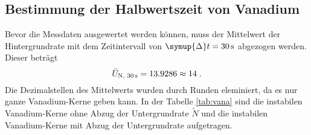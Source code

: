\subsection{Bestimmung der Halbwertszeit von Vanadium}
\label{sub:Vana}
Bevor die Messdaten ausgewertet werden können, muss der Mittelwert der Hintergrundrate mit dem Zeitintervall von $\symup{\Delta} t = \SI{30}{\second}$
abgezogen werden. Dieser beträgt
\begin{equation*}
    \bar{U}_\text{N, \SI{30}{\second}} = 13.9286 \approx 14 \; \text{.}
\end{equation*}
Die Dezimalstellen des Mittelwerts wurden durch Runden eleminiert, da es nur ganze Vanadium-Kerne geben kann.
In der Tabelle \ref{tab:vana} sind die instabilen Vanadium-Kerne ohne Abzug der Untergrundrate $\tilde{N}$ und die instabilen Vanadium-Kerne mit Abzug 
der Untergrundrate aufgetragen.
